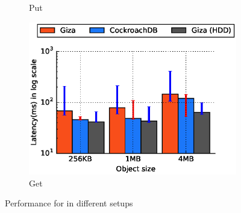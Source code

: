 \begin{figure}[t]
\begin{subfigure}{0.45\textwidth}
      \caption{Put}
      \label{fig:eval_cock_put}
    \end{subfigure}
%
    \begin{subfigure}{0.45\textwidth}
      \includegraphics[width=\linewidth]{plots/giza_cock_get}

      \caption{Get}
      \label{fig:eval_cock_get}
    \end{subfigure}
  \caption{Performance for \name in different setups}
\end{figure}

